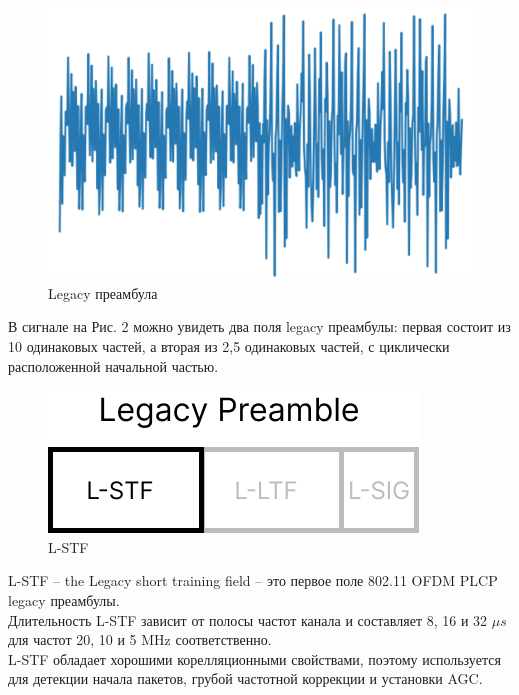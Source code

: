             \begin{figure}[h!]
                \centering
                \includegraphics[scale=0.5]{pictures/preambules.png}
                \caption{Legacy преамбула}
                \label{fig:my_label}
            \end{figure} 
        \newpage
        \par
            В сигнале на Рис. 2 можно увидеть два поля legacy преамбулы: первая состоит из 10 одинаковых частей, а вторая из 2,5 одинаковых частей, с циклически расположенной начальной частью.
            \begin{figure}[h!]
                \centering
                \includegraphics[scale=0.5]{pictures/L-STF.png}
                \caption{L-STF}
                \label{fig:my_label}
            \end{figure} 
        \par
            L-STF -- the Legacy short training field -- это первое поле 802.11 OFDM PLCP legacy преамбулы. \\
            \noindent
            Длительность L-STF зависит от полосы частот канала и составляет 8, 16 и 32 $\mu s$ для частот 20, 10 и 5 MHz соответственно.\\
            \noindent
            L-STF обладает хорошими корелляционными свойствами, поэтому используется для детекции начала пакетов, грубой частотной коррекции и установки AGC.\\
